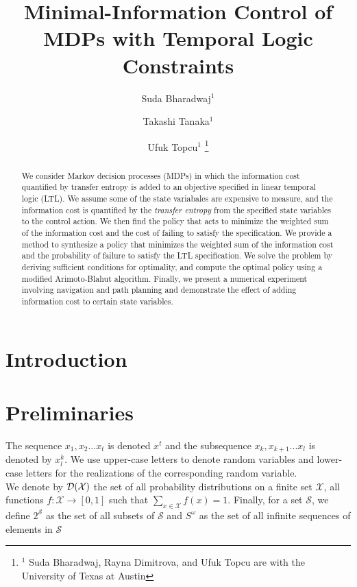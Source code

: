 \documentclass[letterpaper, 10 pt, conference]{ieeeconf}  %
\title{Minimal-Information Control of MDPs with Temporal Logic Constraints
}
\author{Suda Bharadwaj$^{1}$ \and Takashi Tanaka$^{1}$ \and Ufuk Topcu$^{1}$%
\thanks{$^{1}$ Suda Bharadwaj, Rayna Dimitrova, and Ufuk Topcu are with the University of Texas at Austin}%
}
\begin{document}
\maketitle
\thispagestyle{empty}
\pagestyle{empty}


\begin{abstract}
We consider Markov decision processes (MDPs) in which the information cost quantified by transfer entropy is added to an objective specified in linear temporal logic (LTL). We assume some of the state variabales are expensive to measure, and the information cost is quantified by the \emph{transfer entropy} from the specified state variables to the control action. We then find the policy that acts to minimize the weighted sum of the information cost and the cost of failing to satisfy the specification. We provide a method to synthesize a policy that minimizes the weighted sum of the information cost and the probability of failure to satisfy the LTL specification. We solve the problem by deriving sufficient conditions for optimality, and compute the optimal policy using a modified Arimoto-Blahut algorithm. Finally, we present a numerical experiment involving navigation and path planning and demonstrate the effect of adding information cost to certain state variables.
\end{abstract}


\section{Introduction}



\section{Preliminaries}
The sequence $x_1,x_{2}...x_t$ is denoted $x^t$ and the subsequence $x_k,x_{k+1}...x_l$ is denoted by $x_{l}^{k}$. We use upper-case letters to denote random variables and lower-case letters for the realizations of the corresponding random variable. \\
We denote by $\mathcal{D}(\mathcal{X})$ the set of all probability distributions on a finite
set $\mathcal{X}$, \ie all functions $f: \mathcal{X} \to [0,1]$ such that $\sum_{x\in \mathcal{X}}f(x)=1$. Finally, for a set $\mathcal{S}$, we define $2^\mathcal{S}$ as the set of all subsets of $\mathcal{S}$ and $S^{\omega}$ as the set of all infinite sequences of elements in $\mathcal{S}$
 
\end{document}

